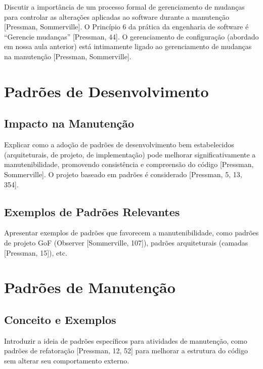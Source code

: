 \documentclass[
]{book}
\begin{document}
Discutir a importância de um processo formal de gerenciamento de mudanças para controlar as alterações aplicadas ao software durante a manutenção {[}Pressman, Sommerville{]}. O Princípio 6 da prática da engenharia de software é ``Gerencie mudanças'' {[}Pressman, 44{]}. O gerenciamento de configuração (abordado em nossa aula anterior) está intimamente ligado ao gerenciamento de mudanças na manutenção {[}Pressman, Sommerville{]}.

\section{Padrões de Desenvolvimento}\label{padruxf5es-de-desenvolvimento}

\subsection{Impacto na Manutenção}\label{impacto-na-manutenuxe7uxe3o}

Explicar como a adoção de padrões de desenvolvimento bem estabelecidos (arquiteturais, de projeto, de implementação) pode melhorar significativamente a manutenibilidade, promovendo consistência e compreensão do código {[}Pressman, Sommerville{]}. O projeto baseado em padrões é considerado {[}Pressman, 5, 13, 354{]}.

\subsection{Exemplos de Padrões Relevantes}\label{exemplos-de-padruxf5es-relevantes}

Apresentar exemplos de padrões que favorecem a manutenibilidade, como padrões de projeto GoF (Observer {[}Sommerville, 107{]}), padrões arquiteturais (camadas {[}Pressman, 15{]}), etc.

\section{Padrões de Manutenção}\label{padruxf5es-de-manutenuxe7uxe3o}

\subsection{Conceito e Exemplos}\label{conceito-e-exemplos}

Introduzir a ideia de padrões específicos para atividades de manutenção, como padrões de refatoração {[}Pressman, 12, 52{]} para melhorar a estrutura do código sem alterar seu comportamento externo.
\end{document}

